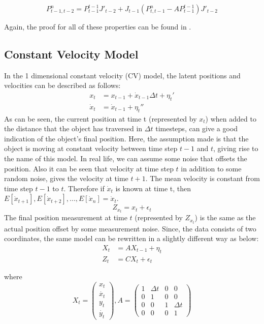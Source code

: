 \documentclass{article}
\begin{document}
\begin{equation}\label{eq:12}
    P_{t-1,t-2}^n=P_{t-1}^{t-1}J'_{t-2} + J_{t-1}(P^n_{t,t-1}-AP_{t-1}^{t-1})J'_{t-2}
\end{equation}

Again, the proof for all of these properties can be found in \cite{shumstof2000}.

\subsection{Constant Velocity Model}
In the 1 dimensional constant velocity (CV) model, the latent positions and velocities can be described as follows:
\begin{equation}\label{eq:13}
\begin{split}
x_t&=x_{t-1}+\dot{x}_{t-1}\Delta t +\eta_t' \\
\dot{x}_{t}&=\dot{x}_{t-1}+\eta_t''
\end{split}
\end{equation}
As can be seen, the current position  at time t (represented by $x_t$) when added to the distance that the object has traversed in $\Delta t$ timesteps, can give a good indication of the object's final position. Here, the assumption made is that the object is moving at constant velocity between time step $t-1$ and $t$, giving rise to the name of this model.  In real life, we can assume some noise that offsets the position. Also it can be seen that velocity at time step $t$ in addition to some random noise, gives the velocity at time $t+1$. The mean velocity is constant from time step $t-1$ to $t$. Therefore if $\dot{x}_t$ is known at time t, then $E[\dot{x}_{t+1}],E[\dot{x}_{t+2}],...,E[\dot{x}_{n}] = \dot{x}_t$. 
\begin{equation}\label{eq:14}
    Z_{x_{t}}=x_{t}+\epsilon_t
\end{equation}
The final position  measurement at time $t$ (represented by $Z_{x_{t}}$) is the same as the actual position offset by some measurement noise. Since, the data consists of two coordinates, the same model can be rewritten in a slightly different way as below:
\begin{equation}\label{eq:15}
    \begin{split}
        X_{t}&=AX_{t-1} + \eta_t\\
        Z_{t}&=CX_{t}+\epsilon_t
    \end{split}
\end{equation}


where $$X_t=\begin{pmatrix}x_t 
\\ \dot{x_t} 
\\ y_t 
\\ \dot{y_t} 
\end{pmatrix}, 
A=\begin{pmatrix}1 & \Delta t & 0 & 0 
\\ 0 & 1 & 0 & 0 
\\ 0 & 0 & 1 &\Delta t
\\ 0 & 0 & 0 & 1 
\end{pmatrix}
$$
\end{document}
